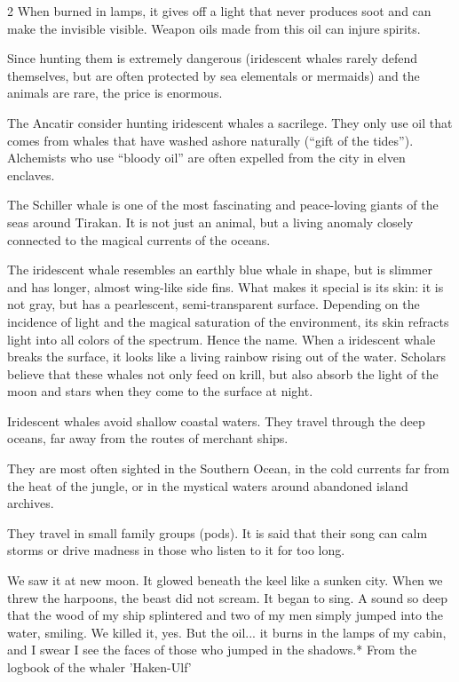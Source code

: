 \begin{multicols}{2}
When burned in lamps, it gives off a light that never produces soot and can make the invisible visible. Weapon oils made from this oil can injure spirits.

Since hunting them is extremely dangerous (iridescent whales rarely defend themselves, but are often protected by sea elementals or mermaids) and the animals are rare, the price is enormous.

The Ancatir consider hunting iridescent whales a sacrilege. They only use oil that comes from whales that have washed ashore naturally (“gift of the tides”). Alchemists who use “bloody oil” are often expelled from the city in elven enclaves.

The Schiller whale is one of the most fascinating and peace-loving giants of the seas around Tirakan. It is not just an animal, but a living anomaly closely connected to the magical currents of the oceans.

The iridescent whale resembles an earthly blue whale in shape, but is slimmer and has longer, almost wing-like side fins. What makes it special is its skin: it is not gray, but has a pearlescent, semi-transparent surface.
Depending on the incidence of light and the magical saturation of the environment, its skin refracts light into all colors of the spectrum. Hence the name. When a iridescent whale breaks the surface, it looks like a living rainbow rising out of the water.
Scholars believe that these whales not only feed on krill, but also absorb the light of the moon and stars when they come to the surface at night.

Iridescent whales avoid shallow coastal waters. They travel through the deep oceans, far away from the routes of merchant ships.

They are most often sighted in the Southern Ocean, in the cold currents far from the heat of the jungle, or in the mystical waters around abandoned island archives.

They travel in small family groups (pods). It is said that their song can calm storms or drive madness in those who listen to it for too long. 

We saw it at new moon. It glowed beneath the keel like a sunken city. When we threw the harpoons, the beast did not scream. It began to sing. A sound so deep that the wood of my ship splintered and two of my men simply jumped into the water, smiling. We killed it, yes. But the oil... it burns in the lamps of my cabin, and I swear I see the faces of those who jumped in the shadows.*
From the logbook of the whaler 'Haken-Ulf'


\end{multicols}
